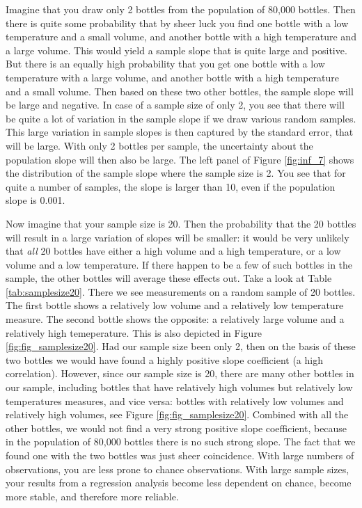 \documentclass[]{book}\usepackage[]{graphicx}\usepackage[]{color}
\begin{document}
Imagine that you draw only 2 bottles from the population of 80,000 bottles. Then there is quite some probability that by sheer luck you find one bottle with a low temperature and a small volume, and another bottle with a high temperature and a large volume. This would yield a sample slope that is quite large and positive. But there is an equally high probability that you get one bottle with a low temperature with a large volume, and another bottle with a high temperature and a small volume. Then based on these two other bottles, the sample slope will be large and negative. In case of a sample size of only 2, you see that there will be quite a lot of variation in the sample slope if we draw various random samples. This large variation in sample slopes is then captured by the standard error, that will be large. With only 2 bottles per sample, the uncertainty about the population slope will then also be large. The left panel of Figure \ref{fig:inf_7} shows the distribution of the sample slope where the sample size is 2. You see that for quite a number of samples, the slope is larger than 10, even if the population slope is 0.001.

Now imagine that your sample size is 20. Then the probability that the 20 bottles will result in a large variation of slopes will be smaller: it would be very unlikely that \textit{all} 20 bottles have either a high volume and a high temperature, or a low volume and a low temperature. If there happen to be a few of such bottles in the sample, the other bottles will average these effects out. Take a look at Table \ref{tab:samplesize20}. There we see measurements on a random sample of 20 bottles. The first bottle shows a relatively low volume and a relatively low temperature measure. The second bottle shows the opposite: a relatively large volume and a relatively high temeperature. This is also depicted in Figure \ref{fig:fig_samplesize20}. Had our sample size been only 2, then on the basis of these two bottles we would have found a highly positive slope coefficient (a high correlation). However, since our sample size is 20, there are many other bottles in our sample, including bottles that have relatively high volumes but relatively low temperatures measures, and vice versa: bottles with relatively low volumes and relatively high volumes, see Figure \ref{fig:fig_samplesize20}. Combined with all the other bottles, we would not find a very strong positive slope coefficient, because in the population of 80,000 bottles there is no such strong slope. The fact that we found one with the two bottles was just sheer coincidence. With large numbers of observations, you are less prone to chance observations. With large sample sizes, your results from a regression analysis become less dependent on chance, become more stable, and therefore more reliable. 
\end{document}
